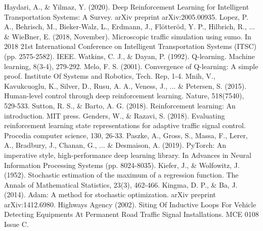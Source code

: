 \documentclass[conference]{IEEEtran}
\begin{document}


%
%
%
\begin{thebibliography}{1}
 Haydari, A., \& Yilmaz, Y. (2020). Deep Reinforcement Learning for Intelligent Transportation Systems: A Survey. arXiv preprint arXiv:2005.00935.
 Lopez, P. A., Behrisch, M., Bieker-Walz, L., Erdmann, J., Flötteröd, Y. P., Hilbrich, R., ... \& WieBner, E. (2018, November). Microscopic traffic simulation using sumo. In 2018 21st International Conference on Intelligent Transportation Systems (ITSC) (pp. 2575-2582). IEEE.
 Watkins, C. J., \& Dayan, P. (1992). Q-learning. Machine learning, 8(3-4), 279-292.
 Melo, F. S. (2001). Convergence of Q-learning: A simple proof. Institute Of Systems and Robotics, Tech. Rep, 1-4.
 Mnih, V., Kavukcuoglu, K., Silver, D., Rusu, A. A., Veness, J.,  ... \& Petersen, S. (2015). Human-level control through deep reinforcement learning. Nature, 518(7540), 529-533.
 Sutton, R. S., \& Barto, A. G. (2018). Reinforcement learning: An introduction. MIT press.
 Genders, W., \& Razavi, S. (2018). Evaluating reinforcement learning state representations for adaptive traffic signal control. Procedia computer science, 130, 26-33.
 Paszke, A., Gross, S., Massa, F., Lerer, A., Bradbury, J., Chanan, G., ... \& Desmaison, A. (2019). PyTorch: An imperative style, high-performance deep learning library. In Advances in Neural Information Processing Systems (pp. 8024-8035).
 Kiefer, J., \& Wolfowitz, J. (1952). Stochastic estimation of the maximum of a regression function. The Annals of Mathematical Statistics, 23(3), 462-466.
 Kingma, D. P., \& Ba, J. (2014). Adam: A method for stochastic optimization. arXiv preprint arXiv:1412.6980.
 Highways Agency (2002). Siting Of Inductive Loops For Vehicle Detecting Equipments At Permanent Road Traffic Signal Installations. MCE 0108 Issue C.
\end{thebibliography}


\end{document}
